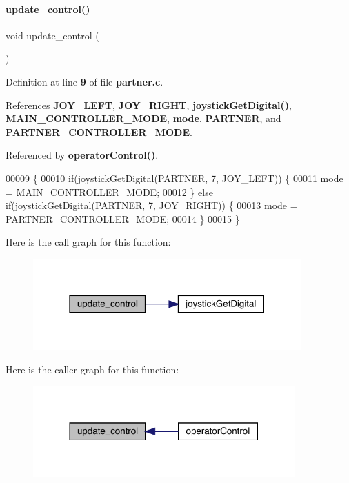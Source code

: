 \paragraph{update\+\_\+control()}
{\footnotesize\ttfamily void update\+\_\+control (\begin{DoxyParamCaption}{ }\end{DoxyParamCaption})}



Definition at line \textbf{ 9} of file \textbf{ partner.\+c}.



References \textbf{ J\+O\+Y\+\_\+\+L\+E\+FT}, \textbf{ J\+O\+Y\+\_\+\+R\+I\+G\+HT}, \textbf{ joystick\+Get\+Digital()}, \textbf{ M\+A\+I\+N\+\_\+\+C\+O\+N\+T\+R\+O\+L\+L\+E\+R\+\_\+\+M\+O\+DE}, \textbf{ mode}, \textbf{ P\+A\+R\+T\+N\+ER}, and \textbf{ P\+A\+R\+T\+N\+E\+R\+\_\+\+C\+O\+N\+T\+R\+O\+L\+L\+E\+R\+\_\+\+M\+O\+DE}.



Referenced by \textbf{ operator\+Control()}.


\begin{DoxyCode}
00009                       \{
00010   \textcolor{keywordflow}{if}(joystickGetDigital(PARTNER, 7, JOY_LEFT)) \{
00011     mode = MAIN_CONTROLLER_MODE;
00012   \} \textcolor{keywordflow}{else} \textcolor{keywordflow}{if}(joystickGetDigital(PARTNER, 7, JOY_RIGHT)) \{
00013     mode = PARTNER_CONTROLLER_MODE;
00014   \}
00015 \}
\end{DoxyCode}
Here is the call graph for this function\+:\nopagebreak
\begin{figure}[H]
\begin{center}
\leavevmode
\includegraphics[width=291pt]{partner_8c_ab2c78903a76d2ed8969271803c78368a_cgraph}
\end{center}
\end{figure}
Here is the caller graph for this function\+:\nopagebreak
\begin{figure}[H]
\begin{center}
\leavevmode
\includegraphics[width=284pt]{partner_8c_ab2c78903a76d2ed8969271803c78368a_icgraph}
\end{center}
\end{figure}


